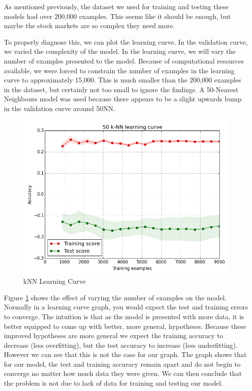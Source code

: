 \documentclass{report}
\begin{document}
As mentioned previously, the dataset we used for training and testing these models had over 200,000 examples. This seems like it should be enough, but maybe the stock markets are so complex they need more.

To properly diagnose this, we can plot the learning curve. In the validation curve, we varied the complexity of the model. In the learning curve, we will vary the number of examples presented to the model. Because of computational resources available, we were forced to constrain the number of examples in the learning curve to approximately 15,000. This is much smaller than the 200,000 examples in the dataset, but certainly not too small to ignore the findings. A 50-Nearest Neighbours model was used because there appears to be a slight upwards bump in the validation curve around 50NN.

\begin{figure}[H]
	\caption{kNN Learning Curve}
	\centerline{\includegraphics[width=\textwidth]{vis/50-learning-curve-15000.png}}
	\label{fig:knn-learning}
\end{figure}

Figure \ref{fig:knn-learning} shows the effect of varying the number of examples on the model. Normally in a learning curve graph, you would expect the test and training errors to converge. The intuition is that as the model is presented with more data, it is better equipped to come up with better, more general, hypotheses. Because these improved hypotheses are more general we expect the training accuracy to decrease (less overfitting), but the test accuracy to increase (less underfitting). However we can see that this is not the case for our graph. The graph shows that for our model, the test and training accuracy remain apart and do not begin to converge no matter how much data they were given. We can then conclude that the problem is not due to lack of data for training and testing our model.
\end{document}
